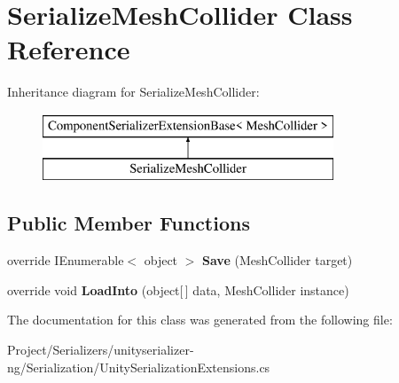 \hypertarget{class_serialize_mesh_collider}{}\section{Serialize\+Mesh\+Collider Class Reference}
\label{class_serialize_mesh_collider}
Inheritance diagram for Serialize\+Mesh\+Collider\+:\begin{figure}[H]
\begin{center}
\leavevmode
\includegraphics[height=2.000000cm]{class_serialize_mesh_collider}
\end{center}
\end{figure}
\subsection*{Public Member Functions}
\begin{DoxyCompactItemize}
\item 
\mbox{\label{class_serialize_mesh_collider_acbc1ced332f6d66efa97213718c8e90a}} 
override I\+Enumerable$<$ object $>$ {\bfseries Save} (Mesh\+Collider target)
\item 
\mbox{\label{class_serialize_mesh_collider_a1eccb54d758de6fa752f5b0b564fb5bd}} 
override void {\bfseries Load\+Into} (object\mbox{[}$\,$\mbox{]} data, Mesh\+Collider instance)
\end{DoxyCompactItemize}


The documentation for this class was generated from the following file\+:\begin{DoxyCompactItemize}
\item 
Project/\+Serializers/unityserializer-\/ng/\+Serialization/Unity\+Serialization\+Extensions.\+cs\end{DoxyCompactItemize}
